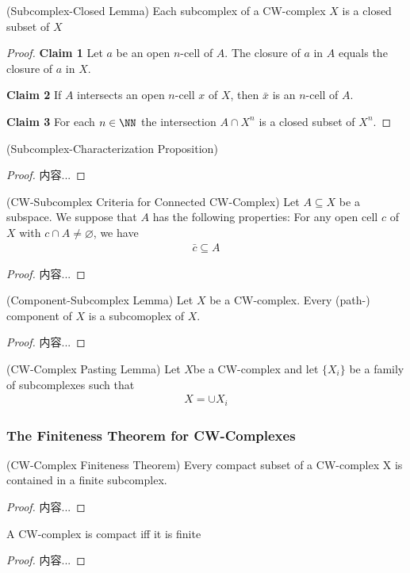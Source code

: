 \documentclass[Total.tex]{subfiles}
\begin{document}
	\begin{lemma}
		(Subcomplex-Closed Lemma) Each subcomplex of a CW-complex $X$ is a closed subset of $X$
	\end{lemma}
	\begin{proof}
		\textbf{Claim 1} Let $a$ be an open $n$-cell of $A$. The closure of $a$ in $A$ equals the closure of $a$ in $X$.
		
		\textbf{Claim 2} If $A$ intersects an open $n$-cell $x$ of $X$, then $\bar{x}$ is an $n$-cell of $A$.
		
		\textbf{Claim 3} For each $n\in \NN$ the intersection $A\cap X^n$ is a closed subset of $X^n$.
	\end{proof}
	\begin{proposition}
		(Subcomplex-Characterization Proposition)
	\end{proposition}
	\begin{proof}
		内容...
	\end{proof}
	
	\begin{proposition}
		(CW-Subcomplex Criteria for Connected CW-Complex) Let $A\subseteq X$ be a subspace. We suppose that $A$ has the following properties: For any open cell $c$ of $X$ with $c\cap A\not=\varnothing$, we have
		\begin{gather*}
			\bar{c}\subseteq A
		\end{gather*} 
		
	\end{proposition}
	\begin{proof}
		内容...
	\end{proof}
	
	\begin{proposition}
		(Component-Subcomplex Lemma) Let $X$ be a CW-complex. Every (path-) component of $X$ is a subcomoplex of $X$.
	\end{proposition}
	\begin{proof}
		内容...
	\end{proof}
	
	\begin{proposition}
		(CW-Complex Pasting Lemma) Let $X$be a CW-complex and let $\{X_i\}$ be a family of subcomplexes such that
		\begin{gather*}
			X=\cup X_i
		\end{gather*}
	\end{proposition}
	\subsubsection{The Finiteness Theorem for CW-Complexes}
	\begin{theorem}
		(CW-Complex Finiteness Theorem) Every compact subset of a CW-complex X is contained in a finite subcomplex.
	\end{theorem}
	\begin{proof}
		内容...
	\end{proof}
	\begin{corollary}
		A CW-complex is compact iff it is finite
	\end{corollary}
	\begin{proof}
		内容...
	\end{proof}
	
\end{document}
